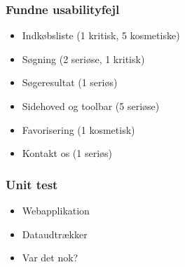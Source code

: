 \begin{frame}
	\frametitle{Fundne usabilityfejl}
    \begin{itemize}
	  \item Indkøbsliste (1 kritisk, 5 kosmetiske)
    \item Søgning (2 seriøse, 1 kritisk)
    \item Søgeresultat (1 seriøs)
    \item Sidehoved og toolbar (5 seriøse)
    \item Favorisering (1 kosmetisk)
    \item Kontakt os (1 seriøs)
  \end{itemize}
\end{frame}

\begin{frame}
  \frametitle{Unit test}
  \begin{itemize}
    \item Webapplikation
    \item Dataudtrækker
    \item Var det nok?
  \end{itemize}
\end{frame}
